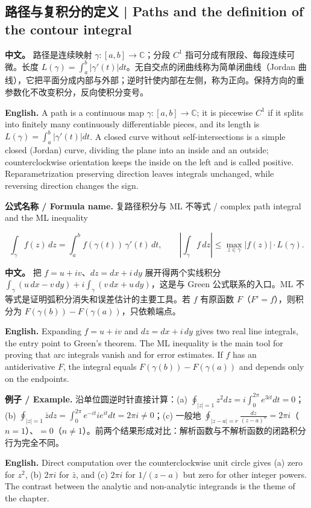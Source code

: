 \documentclass[UTF8,11pt,a4paper]{ctexart}
\newcommand{\EN}[1]{\par\noindent \textbf{English.} #1\par}
\newcommand{\FORMULA}[2]{\par\noindent\textbf{公式名称 / Formula name.} #1 / #2\par}
\newcommand{\EX}[2]{\par\noindent \textbf{例子 / Example.} #1\par\EN{#2}}
\newcommand{\APS}[2]{\par\noindent\textbf{中文。} #1\par\noindent\textbf{English.} #2\par\smallskip}
\begin{document}
\subsection{路径与复积分的定义 | Paths and the definition of the contour integral}
\APS{路径是连续映射 $\gamma:[a,b]\to\mathbb C$；分段 $C^1$ 指可分成有限段、每段连续可微。长度 $L(\gamma)=\int_a^b|\gamma'(t)|dt$。无自交点的闭曲线称为简单闭曲线（Jordan 曲线），它把平面分成内部与外部；逆时针使内部在左侧，称为正向。保持方向的重参数化不改变积分，反向使积分变号。}{A path is a continuous map $\gamma:[a,b]\to\mathbb C$; it is piecewise $C^1$ if it splits into finitely many continuously differentiable pieces, and its length is $L(\gamma)=\int_a^b|\gamma'(t)|dt$. A closed curve without self-intersections is a simple closed (Jordan) curve, dividing the plane into an inside and an outside; counterclockwise orientation keeps the inside on the left and is called positive. Reparametrization preserving direction leaves integrals unchanged, while reversing direction changes the sign.}
\FORMULA{复路径积分与 ML 不等式}{complex path integral and the ML inequality}
\[
\int_\gamma f(z)\,dz=\int_a^b f(\gamma(t))\,\gamma'(t)\,dt,
\qquad
\left|\int_\gamma f\,dz\right|\le\max_{z\in\gamma}|f(z)|\cdot L(\gamma).
\]
\APS{把 $f=u+iv$、$dz=dx+i\,dy$ 展开得两个实线积分 $\int_\gamma(u\,dx-v\,dy)+i\int_\gamma(v\,dx+u\,dy)$，这是与 Green 公式联系的入口。ML 不等式是证明弧积分消失和误差估计的主要工具。若 $f$ 有原函数 $F$（$F'=f$），则积分为 $F(\gamma(b))-F(\gamma(a))$，只依赖端点。}{Expanding $f=u+iv$ and $dz=dx+i\,dy$ gives two real line integrals, the entry point to Green's theorem. The ML inequality is the main tool for proving that arc integrals vanish and for error estimates. If $f$ has an antiderivative $F$, the integral equals $F(\gamma(b))-F(\gamma(a))$ and depends only on the endpoints.}
\EX{沿单位圆逆时针直接计算：(a) $\oint_{|z|=1}z^2dz=i\int_0^{2\pi}e^{3it}dt=0$；(b) $\oint_{|z|=1}\bar zdz=\int_0^{2\pi}e^{-it}ie^{it}dt=2\pi i\ne0$；(c) 一般地 $\oint_{|z-a|=r}\frac{dz}{(z-a)^n}=2\pi i$（$n=1$）、$=0$（$n\ne1$）。前两个结果形成对比：解析函数与不解析函数的闭路积分行为完全不同。}{Direct computation over the counterclockwise unit circle gives (a) zero for $z^2$, (b) $2\pi i$ for $\bar z$, and (c) $2\pi i$ for $1/(z-a)$ but zero for other integer powers. The contrast between the analytic and non-analytic integrands is the theme of the chapter.}
\end{document}
